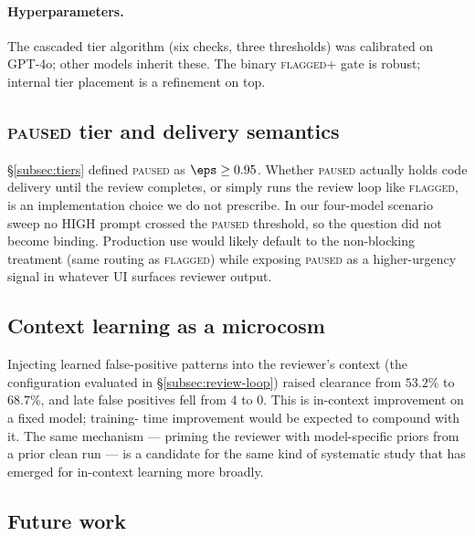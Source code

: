\paragraph{Hyperparameters.} The cascaded tier algorithm (six checks,
three thresholds) was calibrated on GPT-4o; other models inherit
these. The binary \textsc{flagged+} gate is robust; internal tier
placement is a refinement on top.

\subsection{\textsc{paused} tier and delivery semantics}
\label{subsec:paused}

\S\ref{subsec:tiers} defined \textsc{paused} as $\eps \ge 0.95$.
Whether \textsc{paused} actually holds code delivery until the review
completes, or simply runs the review loop like \textsc{flagged}, is
an implementation choice we do not prescribe. In our four-model
scenario sweep no HIGH prompt crossed the \textsc{paused} threshold,
so the question did not become binding. Production use would likely
default to the non-blocking treatment (same routing as
\textsc{flagged}) while exposing \textsc{paused} as a higher-urgency
signal in whatever UI surfaces reviewer output.

\subsection{Context learning as a microcosm}
\label{subsec:context}

Injecting learned false-positive patterns into the reviewer's context
(the configuration evaluated in \S\ref{subsec:review-loop}) raised
clearance from $53.2\%$ to $68.7\%$, and late false positives fell from
$4$ to $0$. This is in-context improvement on a fixed model; training-%
time improvement would be expected to compound with it. The same
mechanism --- priming the reviewer with model-specific priors from a
prior clean run --- is a candidate for the same kind of systematic
study that has emerged for in-context learning more broadly.

\subsection{Future work}
\label{subsec:future}

